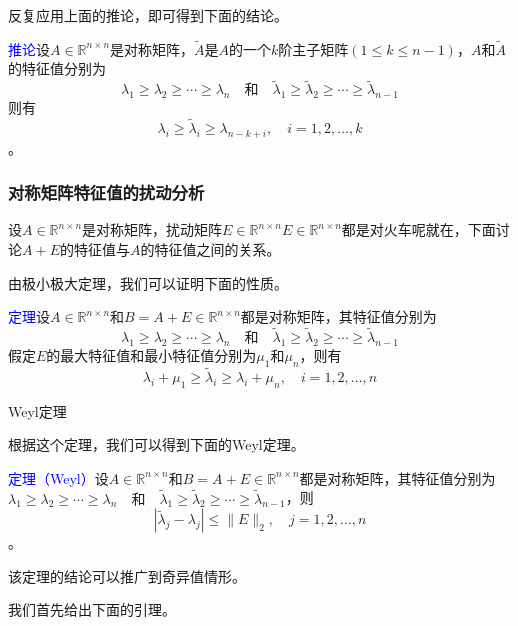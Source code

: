 \documentclass[12pt,a4paper]{article}
\begin{document}
反复应用上面的推论，即可得到下面的结论。

\textcolor{blue}{推论}\quad 设$A \in \mathbb{R}^{n \times n}$是对称矩阵，$\tilde{A}$是$A$的一个$k$阶主子矩阵$(1 \leq k \leq n-1)$，$A$和$\tilde{A}$的特征值分别为$$
\lambda_{1} \geq \lambda_{2} \geq \cdots \geq \lambda_{n} \quad \textbf{和}  \quad \tilde{\lambda}_{1} \geq \tilde{\lambda}_{2} \geq \cdots \geq \tilde{\lambda}_{n-1}
$$则有$$
\lambda_{i} \geq \tilde{\lambda}_{i} \geq \lambda_{n-k+i}, \quad i=1,2, \ldots, k
$$。
\subsubsection{对称矩阵特征值的扰动分析}
设$A \in \mathbb{R}^{n \times n}$是对称矩阵，扰动矩阵$E \in \mathbb{R}^{n \times n}$$E \in \mathbb{R}^{n \times n}$都是对火车呢就在，下面讨论$A+E$的特征值与$A$的特征值之间的关系。

由极小极大定理，我们可以证明下面的性质。

\textcolor{blue}{定理}\quad 设$A \in \mathbb{R}^{n \times n}$和$B=A+E \in \mathbb{R}^{n \times n}$都是对称矩阵，其特征值分别为$$
\lambda_{1} \geq \lambda_{2} \geq \cdots \geq \lambda_{n} \quad \textbf{和}  \quad \tilde{\lambda}_{1} \geq \tilde{\lambda}_{2} \geq \cdots \geq \tilde{\lambda}_{n-1}
$$假定$E$的最大特征值和最小特征值分别为$\mu_{1}$和$\mu_{n}$，则有$$
\lambda_{i}+\mu_{1} \geq \tilde{\lambda}_{i} \geq \lambda_{i}+\mu_{n}, \quad i=1,2, \ldots, n
$$

Weyl定理

根据这个定理，我们可以得到下面的Weyl定理。

\textcolor{blue}{定理（Weyl）}\quad 设$A \in \mathbb{R}^{n \times n}$和$B=A+E \in \mathbb{R}^{n \times n}$都是对称矩阵，其特征值分别为$
\lambda_{1} \geq \lambda_{2} \geq \cdots \geq \lambda_{n} \quad \textbf{和}  \quad \tilde{\lambda}_{1} \geq \tilde{\lambda}_{2} \geq \cdots \geq \tilde{\lambda}_{n-1}
$，则$$
\left|\tilde{\lambda}_{j}-\lambda_{j}\right| \leq\|E\|_{2}, \quad j=1,2, \ldots, n
$$。

该定理的结论可以推广到奇异值情形。

我们首先给出下面的引理。
\end{document}
